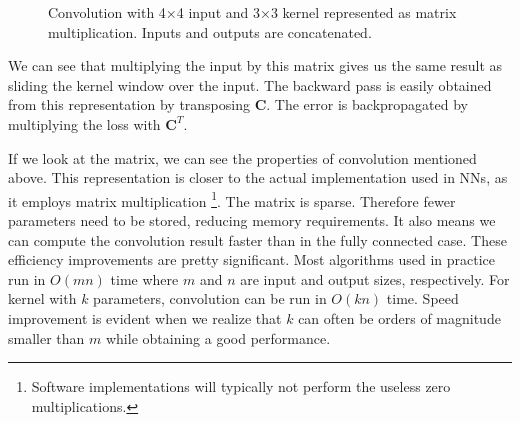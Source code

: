 \begin{figure}[ht]
    \centering
    \caption[Convolution represented as matrix multiplication]{\label{fig:convolution_matrix}Convolution with 4×4 input and 3×3 kernel represented as matrix multiplication. Inputs and outputs are concatenated. }
\end{figure}

We can see that multiplying the input by this matrix gives us the same result as sliding the kernel window over the input. The backward pass is easily obtained from this representation by transposing $\mathbf C$. The error is backpropagated by multiplying the loss with $\mathbf C^T$.

If we look at the matrix, we can see the properties of convolution mentioned above. This representation is closer to the actual implementation used in \glspl{NN}, as it employs matrix multiplication \footnote{Software implementations will typically not perform the useless zero multiplications.}. The matrix is sparse. Therefore fewer parameters need to be stored, reducing memory requirements. It also means we can compute the convolution result faster than in the fully connected case. These efficiency improvements are pretty significant. Most algorithms used in practice run in $O(mn)$ time where $m$ and $n$ are input and output sizes, respectively. For kernel with $k$ parameters, convolution can be run in $O(kn)$ time. Speed improvement is evident when we realize that $k$ can often be orders of magnitude smaller than $m$ while obtaining a good performance.

